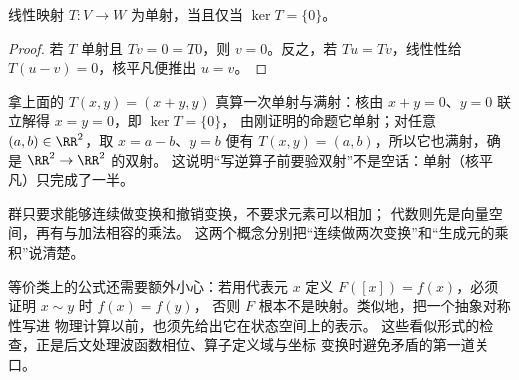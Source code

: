 \begin{proposition}[核与单射]
线性映射 \(T:V\to W\) 为单射，当且仅当 \(\ker T=\{0\}\)。
\end{proposition}
\begin{proof}
若 \(T\) 单射且 \(Tv=0=T0\)，则 \(v=0\)。反之，若 \(Tu=Tv\)，线性性给
\(T(u-v)=0\)，核平凡便推出 \(u=v\)。
\end{proof}

拿上面的 \(T(x,y)=(x+y,y)\) 真算一次单射与满射：核由
\(x+y=0\)、\(y=0\) 联立解得 \(x=y=0\)，即 \(\ker T=\{0\}\)，
由刚证明的命题它单射；对任意 \((a,b)\in\RR^2\)，取 \(x=a-b\)、\(y=b\)
便有 \(T(x,y)=(a,b)\)，所以它也满射，确是 \(\RR^2\to\RR^2\) 的双射。
这说明“写逆算子前要验双射”不是空话：单射（核平凡）只完成了一半。

群只要求能够连续做变换和撤销变换，不要求元素可以相加；
代数则先是向量空间，再有与加法相容的乘法。
这两个概念分别把“连续做两次变换”和“生成元的乘积”说清楚。




等价类上的公式还需要额外小心：若用代表元 \(x\) 定义
\(F([x])=f(x)\)，必须证明 \(x\sim y\) 时 \(f(x)=f(y)\)，
否则 \(F\) 根本不是映射。类似地，把一个抽象对称性写进
物理计算以前，也须先给出它在状态空间上的表示。
这些看似形式的检查，正是后文处理波函数相位、算子定义域与坐标
变换时避免矛盾的第一道关口。
